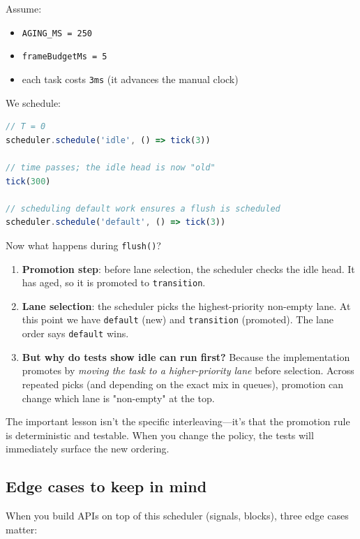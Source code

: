 Assume:

\begin{itemize}
  \item \texttt{AGING\_MS = 250}
  \item \texttt{frameBudgetMs = 5}
  \item each task costs \texttt{3ms} (it advances the manual clock)
\end{itemize}

We schedule:

\begin{lstlisting}[language=JavaScript]
// T = 0
scheduler.schedule('idle', () => tick(3))

// time passes; the idle head is now "old"
tick(300)

// scheduling default work ensures a flush is scheduled
scheduler.schedule('default', () => tick(3))
\end{lstlisting}

Now what happens during \texttt{flush()}?

\begin{enumerate}
  \item \textbf{Promotion step}: before lane selection, the scheduler checks the idle head.
        It has aged, so it is promoted to \texttt{transition}.
  \item \textbf{Lane selection}: the scheduler picks the highest-priority non-empty lane.
        At this point we have \texttt{default} (new) and \texttt{transition} (promoted).
        The lane order says \texttt{default} wins.
  \item \textbf{But why do tests show idle can run first?} Because the implementation promotes by \emph{moving the task to a higher-priority lane} before selection.
        Across repeated picks (and depending on the exact mix in queues), promotion can change which lane is "non-empty" at the top.
\end{enumerate}

The important lesson isn't the specific interleaving---it's that the promotion rule is deterministic and testable.
When you change the policy, the tests will immediately surface the new ordering.

\subsection{Edge cases to keep in mind}

When you build APIs on top of this scheduler (signals, blocks), three edge cases matter:

